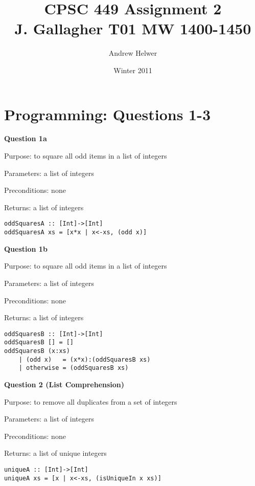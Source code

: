 \documentclass{article}
\begin{document}
\lstset{language=Haskell, frame=single}

\title{CPSC 449 Assignment 2 \\ J. Gallagher T01 MW 1400-1450}
\author{Andrew Helwer}
\date{Winter 2011}
\maketitle

\thispagestyle{myheadings}

\section{Programming: Questions 1-3}

\textbf{Question 1a}

Purpose: to square all odd items in a list of integers

Parameters: a list of integers

Preconditions: none

Returns: a list of integers

\begin{lstlisting}
oddSquaresA :: [Int]->[Int]
oddSquaresA xs = [x*x | x<-xs, (odd x)]
\end{lstlisting}

\textbf{Question 1b}

Purpose: to square all odd items in a list of integers

Parameters: a list of integers

Preconditions: none

Returns: a list of integers

\begin{lstlisting}
oddSquaresB :: [Int]->[Int]
oddSquaresB [] = []
oddSquaresB (x:xs)
    | (odd x)	= (x*x):(oddSquaresB xs)
    | otherwise	= (oddSquaresB xs)
\end{lstlisting}
    
\newpage

\thispagestyle{myheadings}

\textbf{Question 2 (List Comprehension)}

Purpose: to remove all duplicates from a set of integers

Parameters: a list of integers

Preconditions: none

Returns: a list of unique integers

\begin{lstlisting}
uniqueA :: [Int]->[Int]
uniqueA xs = [x | x<-xs, (isUniqueIn x xs)]
\end{lstlisting}
\end{document}
